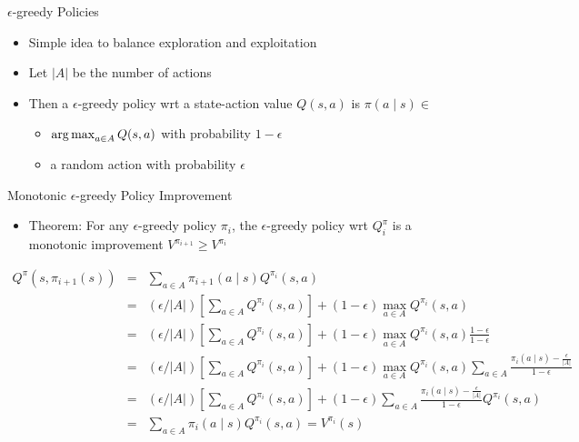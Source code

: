 \begin{frame}[c]{$\epsilon$-greedy Policies}
	
	\begin{itemize}
	\item Simple idea to balance exploration and exploitation
	\item Let $|A|$ be the number of actions
	\item Then a $\epsilon$-greedy policy wrt a state-action value $Q(s,a)$ is $\pi(a\mid s) \in $
	\begin{itemize}
		\item $\operatorname*{arg\,max}_{a\in A} Q(s,a)$ with probability $1 - \epsilon$
		\item a random action with probability $\epsilon$
	\end{itemize}
\end{itemize}
	
\end{frame}
\begin{frame}[c]{Monotonic $\epsilon$-greedy Policy Improvement}
	
	\begin{itemize}
		\item Theorem: For any $\epsilon$-greedy policy $\pi_i$, the $\epsilon$-greedy policy wrt $Q^{\pi}_i$ is a monotonic improvement $V^{\pi_{i+1}} \geq V^{\pi_i}$
	\end{itemize}

\footnotesize
\begin{eqnarray}
Q^\pi (s,\pi_{i+1} (s)) &=& \sum_{a \in A} \pi_{i+1}(a \mid s) Q^{\pi_{i}}(s,a)\nonumber\\
	&=& (\epsilon / |A|) \left[\sum_{a\in A} Q^{\pi_{i}}(s,a) \right] + (1- \epsilon) \max_{a\in A} Q^{\pi_{i}}(s,a)\nonumber\\
	&=& (\epsilon / |A|) \left[\sum_{a\in A} Q^{\pi_{i}}(s,a) \right] + (1- \epsilon) \max_{a\in A} Q^{\pi_{i}}(s,a)\frac{1-\epsilon}{1-\epsilon}\nonumber\\
	&=& (\epsilon / |A|) \left[\sum_{a\in A} Q^{\pi_{i}}(s,a) \right] + (1- \epsilon) \max_{a\in A} Q^{\pi_{i}}(s,a)\sum_{a\in A}\frac{\pi_i(a\mid s) - \frac{\epsilon}{|A|}}{1-\epsilon}\nonumber\\
	&=& (\epsilon / |A|) \left[\sum_{a\in A} Q^{\pi_{i}}(s,a) \right] + (1- \epsilon) \sum_{a\in A}\frac{\pi_i(a\mid s) - \frac{\epsilon}{|A|}}{1-\epsilon} Q^{\pi_{i}}(s,a)\nonumber\\
	&=& \sum_{a\in A} \pi_i (a \mid s) Q^{\pi_i}(s,a) = V^{\pi_i}(s)\nonumber
\end{eqnarray}
	
\end{frame}
